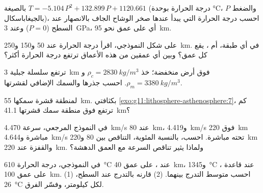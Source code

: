 \begin{exercise}[$\star$]\label{exo:g11:lithosphere-asthenosphere:5}
بالصيغة $T = -5.104\,P^2 + 132.899\,P + 1120.661$ (درجة الحرارة بوحدة
\unit{\celsius}، والضغط $P$ بالجيغاباسكال)، احسب درجة الحرارة التي
يبدأ عندها صخر الوشاح الجاف بالانصهار عند السطح ($P = 0$) وعند
\qty{3}{GPa}، أي على عمق نحو \qty{95}{km}.
\end{exercise}

\begin{exercise}[$\star\star$]\label{exo:g11:lithosphere-asthenosphere:6}
على شكل  النموذجي، اقرأ درجة الحرارة عند 50 و150
و\qty{250}{km}. في أي طبقة،  أم ، يقع كل عمق؟
وبين أي عمقين من هذه الأعماق ترتفع درجة الحرارة أكثر؟
\end{exercise}

\begin{exercise}[$\star\star$]\label{exo:g11:lithosphere-asthenosphere:7}
ترتفع سلسلة جبلية \qty{3}{km} فوق أرض منخفضة؛ خذ $\rho_c =
\qty{2830}{kg/m^3}$ و$\rho_m = \qty{3380}{kg/m^3}$. احسب جذرها
والسمك الإضافي لقشرتها.
\end{exercise}

\begin{exercise}[$\star\star$]\label{exo:g11:lithosphere-asthenosphere:8}
لمنطقة قشرة سمكها \qty{55}{km}. بكثافتي
\cref{exo:g11:lithosphere-asthenosphere:7}، كم ترتفع فوق
منطقة سمك قشرتها \qty{41.1}{km}؟
\end{exercise}

\begin{exercise}[$\star\star$]\label{exo:g11:lithosphere-asthenosphere:9}
في النموذج المرجعي، سرعة  \qty{4.470}{km/s} عند \qty{80}{km}،
و\qty{4.419}{km/s} فوق \qty{220}{km} مباشرة و\qty{4.644}{km/s} تحته مباشرة.
احسب، بالنسبة المئوية، التناقص بين 80 و\qty{220}{km} والقفزة
عند \qty{220}{km}. ولماذا يثير تناقص السرعة مع العمق الدهشة؟
\end{exercise}

\begin{exercise}[$\star\star$]\label{exo:g11:lithosphere-asthenosphere:10}
في  النموذجي، درجة الحرارة \qty{610}{\celsius} عند ،
على عمق \qty{40}{km}، و\qty{1345}{\celsius} عند قاعدة ،
على عمق \qty{100}{km}. (1) احسب متوسط التدرج بينهما. (2)
قارنه بالتدرج عند السطح، \qty{26}{\celsius} لكل كيلومتر،
وفسّر الفرق.
\end{exercise}

